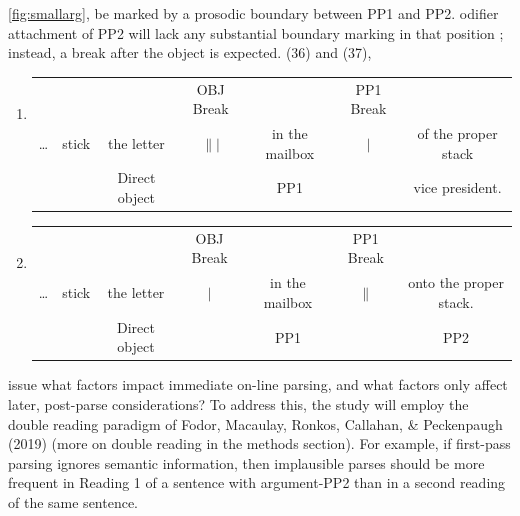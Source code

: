 \documentclass[12pt,oneside]{book}
\begin{document}
  \ref{fig:smallarg},  be marked by a prosodic boundary between PP1 and PP2. odifier attachment of PP2 will lack any substantial boundary marking in that position ; instead, a break after the object is expected.  (36) and (37), 

\singlespacing

\begin{enumerate}
\def\labelenumi{(\arabic{enumi})}
\setcounter{enumi}{35}
\item
  \begin{tabular}{ccccccc}
    & & & \small OBJ Break & & \small PP1 Break & \\
    \dots & stick & the letter & $\||$ & in the mailbox & $\vert$ & of the proper stack \\
    & & \footnotesize Direct object & & \footnotesize PP1 & & \footnotesize vice president. \\
  \end{tabular}
\item
  \begin{tabular}{ccccccc}
    & & & \small OBJ Break & & \small PP1 Break & \\
    \dots & stick & the letter & $\vert$ & in the mailbox & $\|$ & onto the proper stack. \\
    & & \footnotesize Direct object & & \footnotesize PP1 & & \footnotesize PP2 \\
  \end{tabular}
\end{enumerate}

\doublespacing

 issue  what factors impact immediate on-line parsing, and what factors only affect later, post-parse considerations? To address this, the study will employ the double reading paradigm of Fodor, Macaulay, Ronkos, Callahan, \& Peckenpaugh (2019) (more on double reading in the methods section). For example, if first-pass parsing ignores semantic information, then  implausible parses should be more frequent in Reading 1 of a sentence with argument-PP2 than in a second reading of the same sentence.
\end{document}
